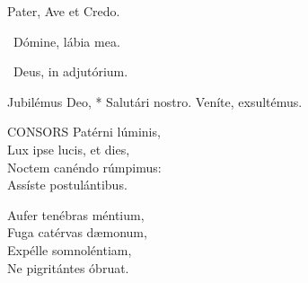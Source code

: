 

Pater, Ave et Credo.

\V\ Dómine, lábia mea.

\V\ Deus, in adjutórium.


 Jubilémus Deo, * Salutári nostro.  Veníte, exsultémus.


\lettrine[lines=2]{C}{ONSORS} Patérni lúminis,\\
Lux ipse lucis, et dies,\\
Noctem canéndo rúmpimus:\\
Assíste postulántibus.

Aufer tenébras méntium,\\
Fuga catérvas dæmonum,\\
Expélle somnoléntiam,\\
Ne pigritántes óbruat.

